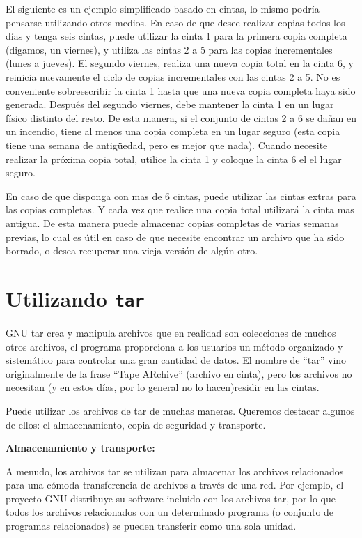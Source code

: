 \documentclass[12pt]{article}
\begin{document}
El siguiente es un ejemplo simplificado basado en cintas, lo mismo podría 
pensarse utilizando otros medios. 
En caso de que desee realizar copias todos los días y tenga seis cintas, 
puede utilizar la cinta 1 para la primera copia completa (digamos, un 
viernes), y utiliza las cintas 2 a 5 para las copias incrementales 
(lunes a jueves). El segundo viernes, realiza una nueva copia total en la 
cinta 6, y reinicia nuevamente el ciclo de copias incrementales con las 
cintas 2 a 5. No es conveniente sobreescribir la cinta 1 hasta que una 
nueva copia completa haya sido generada. Después del segundo viernes, debe
mantener la cinta 1 en un lugar físico distinto del resto. De esta manera, 
si el conjunto de cintas 2 a 6 se dañan en un incendio, tiene al menos una 
copia completa en un lugar seguro (esta copia tiene una semana de 
antigüedad, pero es mejor que nada).  Cuando necesite realizar la próxima 
copia total, utilice la cinta 1 y coloque la cinta 6 el el lugar seguro.

En caso de que disponga con mas de 6 cintas, puede utilizar las cintas 
extras para las copias completas. Y cada vez que realice una copia total 
utilizará la cinta mas antigua. De esta manera puede almacenar copias
completas de varias semanas previas, lo cual es útil en caso de que necesite
encontrar un archivo que ha sido borrado, o desea recuperar una vieja 
versión de algún otro.

\section*{Utilizando \texttt{tar}}
GNU tar crea y manipula archivos que en realidad son colecciones de muchos 
otros archivos, el programa proporciona a los usuarios un método organizado 
y sistemático para controlar una gran cantidad de datos. El nombre de 
``tar'' vino originalmente de la frase ``Tape ARchive'' (archivo en cinta),
pero los archivos no necesitan (y en estos días, por lo general no lo hacen)residir en las cintas.


Puede utilizar los archivos de tar de muchas maneras. Queremos destacar 
algunos de ellos: el almacenamiento, copia de seguridad y transporte.

{\bf Almacenamiento y transporte:}

A menudo, los archivos tar se utilizan para almacenar los archivos 
relacionados para una cómoda transferencia de archivos a través de una red.
Por ejemplo, el proyecto GNU distribuye su software incluido con los 
archivos tar, por lo que todos los archivos relacionados con un determinado 
programa (o conjunto de programas relacionados) se pueden transferir como 
una sola unidad.
\end{document}
